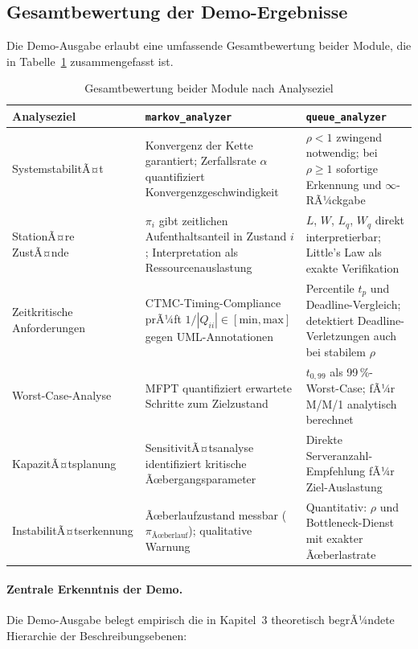 ﻿\documentclass[a4paper,12pt]{report}
\theoremstyle{definition}
\begin{document}
\subsection{Gesamtbewertung der Demo-Ergebnisse}

Die Demo-Ausgabe erlaubt eine umfassende Gesamtbewertung beider Module,
die in Tabelle~\ref{tab:gesamtbewertung} zusammengefasst ist.

\begin{table}[H]
	\centering
	\begin{tabular}{@{}p{4cm}p{5cm}p{5cm}@{}}
		\toprule
		\textbf{Analyseziel} & \textbf{\texttt{markov\_analyzer}} &
		\textbf{\texttt{queue\_analyzer}} \\
		\midrule
		SystemstabilitÃ¤t & Konvergenz der Kette garantiert;
		Zerfallsrate $\alpha$ quantifiziert Konvergenzgeschwindigkeit &
		$\rho < 1$ zwingend notwendig; bei $\rho \geq 1$ sofortige
		Erkennung und $\infty$-RÃ¼ckgabe \\
		\addlinespace
		StationÃ¤re ZustÃ¤nde & $\pi_i$ gibt zeitlichen Aufenthaltsanteil
		in Zustand $i$; Interpretation als Ressourcenauslastung &
		$L$, $W$, $L_q$, $W_q$ direkt interpretierbar;
		Little's Law als exakte Verifikation \\
		\addlinespace
		Zeitkritische Anforderungen & CTMC-Timing-Compliance prÃ¼ft
		$1/|Q_{ii}| \in [\text{min}, \text{max}]$ gegen UML-Annotationen &
		Percentile $t_p$ und Deadline-Vergleich; detektiert
		Deadline-Verletzungen auch bei stabilem $\rho$ \\
		\addlinespace
		Worst-Case-Analyse & MFPT quantifiziert erwartete Schritte
		zum Zielzustand & $t_{0{,}99}$ als 99\,\%-Worst-Case;
		fÃ¼r M/M/1 analytisch berechnet \\
		\addlinespace
		KapazitÃ¤tsplanung & SensitivitÃ¤tsanalyse identifiziert kritische
		Ãœbergangsparameter & Direkte Serveranzahl-Empfehlung
		fÃ¼r Ziel-Auslastung \\
		\addlinespace
		InstabilitÃ¤tserkennung & Ãœberlaufzustand messbar ($\pi_\text{Ãœberlauf}$);
		qualitative Warnung & Quantitativ: $\rho$ und Bottleneck-Dienst
		mit exakter Ãœberlastrate \\
		\bottomrule
	\end{tabular}
	\caption{Gesamtbewertung beider Module nach Analyseziel}
	\label{tab:gesamtbewertung}
\end{table}

\paragraph{Zentrale Erkenntnis der Demo.}
Die Demo-Ausgabe belegt empirisch die in Kapitel~3 theoretisch begrÃ¼ndete
Hierarchie der Beschreibungsebenen:
\end{document}
